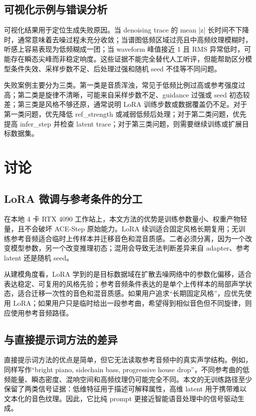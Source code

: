 \documentclass[UTF8,a4paper,zihao=-4,fontset=none]{ctexart}
\begin{document}
\subsection{可视化示例与错误分析}
可视化结果用于定位生成失败原因。当 denoising trace 的 mean |z| 长时间不下降时，通常意味着去噪过程未充分收敛；当谱图低频区域过亮且中高频纹理模糊时，听感上容易表现为低频糊成一团；当 waveform 峰值接近 1 且 RMS 异常低时，可能存在瞬态尖峰而非稳定响度。这些证据不能完全替代人工听评，但能帮助区分模型条件失效、采样步数不足、后处理过强和随机 seed 不佳等不同问题。

失败案例主要分为三类。第一类是音质浑浊，常见于低频比例过高或参考强度过高；第二类是旋律不清晰，可能来自采样步数不足、guidance 过强或 seed 初态较差；第三类是风格不够还原，通常说明 LoRA 训练步数或数据覆盖仍不足。对于第一类问题，优先降低 ref\_strength 或减弱低频后处理；对于第二类问题，优先提高 infer\_step 并检查 latent trace；对于第三类问题，则需要继续训练或扩展目标数据集。

\section{讨论}
\subsection{LoRA 微调与参考条件的分工}
在本地 4 卡 RTX 4090 工作站上，本文方法的优势是训练参数量小、权重产物轻量，且不会破坏 ACE-Step 原始能力。LoRA 续训适合固定风格长期复用；无训练参考音频适合临时上传样本并迁移音色和混音质感。二者必须分离，因为一个改变模型参数，另一个改变推理初态；混用会导致无法判断差异来自 adapter、参考 latent 还是随机 seed。

从建模角度看，LoRA 学到的是目标数据域在扩散去噪网络中的参数化偏移，适合表达稳定、可复用的风格先验；参考音频条件表达的是单个上传样本的局部声学状态，适合迁移一次性的音色和混音质感。如果用户追求“长期固定风格”，应优先使用 LoRA；如果用户只是临时给出一段参考曲，希望得到相似音色但不同旋律，则应使用参考音频路径。

\subsection{与直接提示词方法的差异}
直接提示词方法的优点是简单，但它无法读取参考音频中的真实声学结构。例如，同样写作“bright piano, sidechain bass, progressive house drop”，不同参考曲的低频能量、瞬态密度、混响空间和高频纹理仍可能完全不同。本文的无训练路径至少保留了两类信号证据：低维特征用于描述可解释属性，高维 latent 用于携带难以文本化的音色纹理。因此，它比纯 prompt 更接近智能语音处理中的信号驱动生成。
\end{document}
